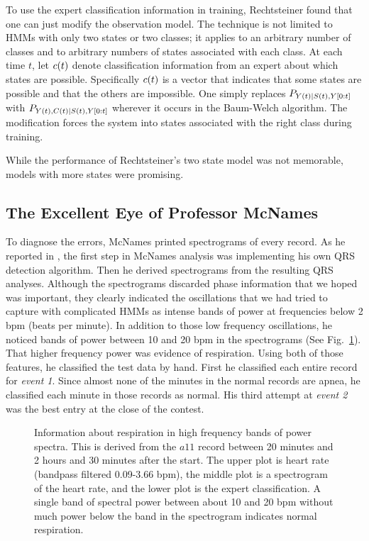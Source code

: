 To use the expert classification information in training, Rechtsteiner
found that one can just modify the observation model.  The technique
is not limited to HMMs with only two states or two classes; it applies
to an arbitrary number of classes and to arbitrary numbers of states
associated with each class.  At each time $t$, let ${c}{(t)}$ denote
classification information from an expert about which states are
possible.  Specifically ${c}{(t)}$ is a vector that indicates that
some states are possible and that the others are impossible.  One
simply replaces $P_{{Y}{(t)}|{S}{(t)},Y[0:t]}$ with
$P_{{Y}{(t)},{C}{(t)}|{S}{(t)},Y[0:t]}$ wherever it occurs
in the Baum-Welch algorithm.  The modification forces the system into
states associated with the right class during training.

While the performance of Rechtsteiner's two state model was not
memorable, models with more states were promising.

\subsection{The Excellent Eye of Professor McNames}
\label{sec:mcnames}

To diagnose the errors, McNames printed spectrograms of every record.
As he reported in \cite{Mcnames2000ObstructiveSA}, the first step in
McNames analysis was implementing his own QRS detection algorithm.
Then he derived spectrograms from the resulting QRS analyses.
Although the spectrograms discarded phase information that we hoped
was important, they clearly indicated the oscillations that we had
tried to capture with complicated HMMs as intense bands of power at
frequencies below 2 bpm (beats per minute).
  In addition to those low
frequency oscillations, he noticed bands of power between 10 and 20
bpm in the spectrograms (See Fig.~\ref{fig:sgram}).  That higher
frequency power was evidence of respiration.  Using both of those
features, he classified the test data by hand.  First he classified
each entire record for \emph{event 1}.  Since almost none of the
minutes in the normal records are apnea, he classified each minute in
those records as normal.  His third attempt at \emph{event 2} was the
best entry at the close of the contest.

\begin{figure}
  \caption[Information about respiration in high
  frequency phase variations]
  {Information about respiration in high frequency bands of power
    spectra.  This is derived from the $a11$ record between 20 minutes
    and 2 hours and 30 minutes after the start.  The upper plot is
    heart rate (bandpass filtered 0.09-3.66 bpm), the middle plot is a
    spectrogram of the heart rate, and the lower plot is the expert
    classification.  A single band of spectral power between about 10
    and 20 bpm without much power below the band in the spectrogram
    indicates normal respiration.}
  \label{fig:sgram}
\end{figure}

